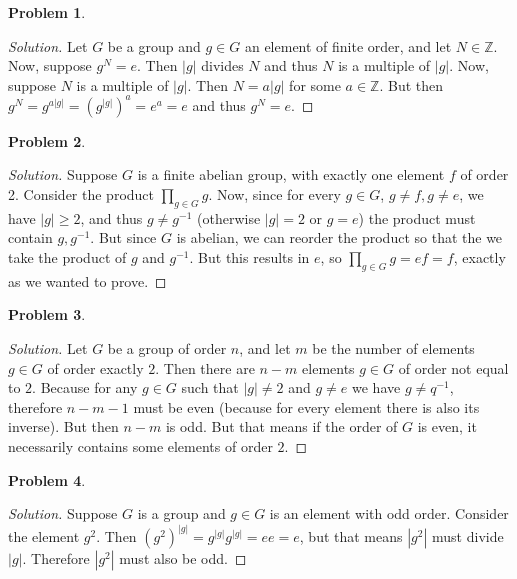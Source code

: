 \documentclass{article}
\theoremstyle{definition}
\newtheorem{problem-internal}{Problem}[subsection]
\newenvironment{problem}{
	\medskip
	\begin{problem-internal}
	}{
\end{problem-internal}
}
\newenvironment{solution}{
	\begin{proof}[Solution]
		\vspace{-8px}
		\setlength{\parskip}{4px}
		\setlength{\parindent}{0px}
	}{
\end{proof}
}
\newcommand{\abs}[1]{\left|#1\right|}
\begin{document}
\begin{problem}
\end{problem}

\begin{solution}
	Let $G$ be a group and $g \in G$ an element of finite order, and let $N \in \mathbb{Z}$. Now, suppose $g^N = e$. Then $\abs{g}$ divides $N$ and thus $N$ is a multiple of $\abs{g}$. Now, suppose $N$ is a multiple of $\abs{g}$. Then $N = a\abs{g}$ for some $a \in \mathbb{Z}$. But then $g^N = g^{a\abs{g}}=(g^{\abs{g}})^a=e^a=e$ and thus $g^N = e$.
\end{solution}

\begin{problem}
\end{problem}

\begin{solution}
	Suppose $G$ is a finite abelian group, with exactly one element $f$ of order 2. Consider the product $\prod_{g \in G} g$. Now, since for every $g \in G$, $g \neq f, g \neq e$, we have $\abs{g} \geq 2$, and thus $g \neq g^{-1}$ (otherwise $\abs{g} = 2$ or $g = e$) the product must contain $g, g^{-1}$. But since $G$ is abelian, we can reorder the product so that the we take the product of $g$ and $g^{-1}$. But this results in $e$, so $\prod_{g \in G} g = ef = f$, exactly as we wanted to prove.
\end{solution}

\begin{problem}
\end{problem}

\begin{solution}
	Let $G$ be a group of order $n$, and let $m$ be the number of elements $g \in G$ of order exactly $2$. Then there are $n - m$ elements $g \in G$ of order not equal to $2$. Because for any $g \in G$ such that $\abs{g} \neq 2$ and $g \neq e$ we have $g \neq q^{-1}$, therefore $n - m - 1$ must be even (because for every element there is also its inverse). But then $n - m$ is odd. But that means if the order of $G$ is even, it necessarily contains some elements of order $2$.
\end{solution}

\begin{problem}
\end{problem}

\begin{solution}
	Suppose $G$ is a group and $g \in G$ is an element with odd order. Consider the element $g^2$. Then $(g^2)^{\abs{g}}=g^{\abs{g}}g^{\abs{g}}=ee=e$, but that means $\abs{g^2}$ must divide $\abs{g}$. Therefore $\abs{g^2}$ must also be odd.
\end{solution}
\end{document}
